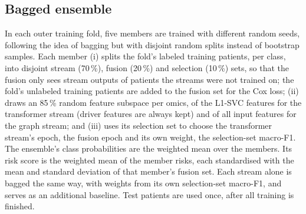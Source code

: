 \documentclass[conference]{IEEEtran}
\begin{document}
\subsection{Bagged ensemble}
\label{sec:bagging}
In each outer training fold, five members are trained with different random seeds, following the idea of bagging
\cite{breiman1996bagging} but with disjoint random splits instead of bootstrap samples. Each member
(i) splits the fold's labeled training patients, per class, into disjoint stream (70\,\%), fusion (20\,\%) and selection
(10\,\%) sets, so that the fusion only sees stream outputs of patients the streams were not trained on; the fold's
unlabeled training patients are added to the fusion set for the Cox loss;
(ii) draws an 85\,\% random feature subspace \cite{ho1998subspace} per omics, of the L1-SVC features for the transformer
stream (driver features are always kept) and of all input features for the graph stream; and
(iii) uses its selection set to choose the transformer stream's epoch, the fusion epoch and its own weight, the
selection-set macro-F1.
The ensemble's class probabilities are the weighted mean over the members. Its risk score is the weighted mean of the
member risks, each standardised with the mean and standard deviation of that member's fusion set. Each stream alone is
bagged the same way, with weights from its own selection-set macro-F1, and serves as an additional baseline. Test
patients are used once, after all training is finished.
\end{document}
